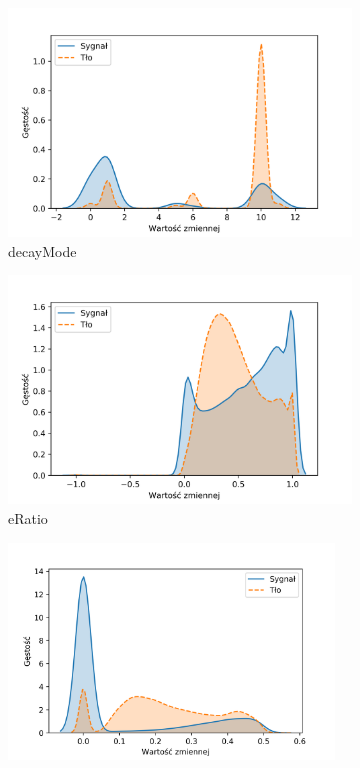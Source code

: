 \documentclass{pracalicmgr}
\begin{document}
	\begin{figure}[H]
	\begin{subfigure}{.5\textwidth}
	\centering
	\includegraphics[width=1\textwidth]{difference_decayMode.png}
	\caption{decayMode}
	\end{subfigure}
	\begin{subfigure}{.5\textwidth}
	\centering
	\includegraphics[width=1\textwidth]{difference_eRatio.png}
	\caption{eRatio}
	\end{subfigure}
	\begin{subfigure}{.5\textwidth}
	\centering
	\includegraphics[width=0.95\textwidth]{difference_ptWeightedDrIsolation.png}

\end{subfigure}
\end{figure}
\end{document}
